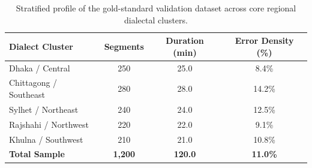 
\begin{table}[t]
\centering
\small
\begin{tabular}{lccc}
\toprule
\textbf{Dialect Cluster} & \textbf{Segments} & \textbf{Duration (min)} & \textbf{Error Density (\%)} \\
\midrule
Dhaka / Central & 250 & 25.0 & 8.4\% \\
Chittagong / Southeast & 280 & 28.0 & 14.2\% \\
Sylhet / Northeast & 240 & 24.0 & 12.5\% \\
Rajshahi / Northwest & 220 & 22.0 & 9.1\% \\
Khulna / Southwest & 210 & 21.0 & 10.8\% \\
\midrule
\textbf{Total Sample} & \textbf{1,200} & \textbf{120.0} & \textbf{11.0\%} \\
\bottomrule
\end{tabular}
\caption{Stratified profile of the gold-standard validation dataset across core regional dialectal clusters.}
\label{tab:dataset_profile}
\end{table}
